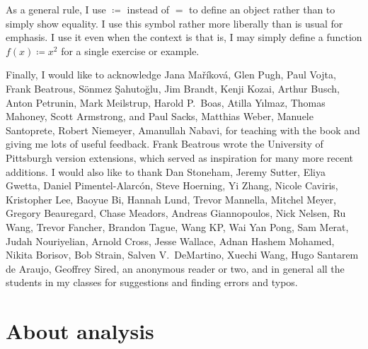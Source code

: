 As a general rule, I use $\coloneqq$ instead of $=$ to define an
object rather than to simply show equality.  I use this symbol rather more
liberally than is usual for emphasis.
I use it even when the context is 
that is, I may simply define a function $f(x) \coloneqq x^2$
for a single exercise or example.

\medskip

Finally, I would like to acknowledge Jana Ma\v{r}\'ikov\'a,
Glen Pugh, Paul Vojta, Frank Beatrous, S\"{o}nmez \c{S}ahuto\u{g}lu,
Jim Brandt, Kenji Kozai, Arthur Busch,  Anton Petrunin,
Mark Meilstrup, Harold P.\ Boas, Atilla Y{\i}lmaz,
Thomas Mahoney, Scott Armstrong, and Paul Sacks,
Matthias Weber, Manuele Santoprete,
Robert Niemeyer, Amanullah Nabavi,
for teaching with the book and giving me lots of useful feedback.
Frank Beatrous wrote the University of Pittsburgh version extensions, which
served as inspiration for many more recent additions.
I would also like to thank
Dan Stoneham, Jeremy Sutter, Eliya Gwetta, Daniel Pimentel-Alarc\'on,
Steve Hoerning, Yi Zhang, Nicole Caviris,
Kristopher Lee, Baoyue Bi, Hannah Lund,
Trevor Mannella, Mitchel Meyer, Gregory Beauregard,
Chase Meadors, Andreas Giannopoulos, Nick Nelsen,
Ru Wang, Trevor Fancher, Brandon Tague, Wang KP,
Wai Yan Pong, Sam Merat, Judah Nouriyelian,
Arnold Cross, Jesse Wallace,
Adnan Hashem Mohamed,
Nikita Borisov, Bob Strain,
Salven V.\ DeMartino,
Xuechi Wang,
Hugo Santarem de Araujo,
Geoffrey Sired,
an anonymous reader or two, and in general all the students in my classes
for suggestions and finding errors and typos.

\VolTwoIntro


\sectionnewpage
\section{About analysis} \label{sec:aboutra}

